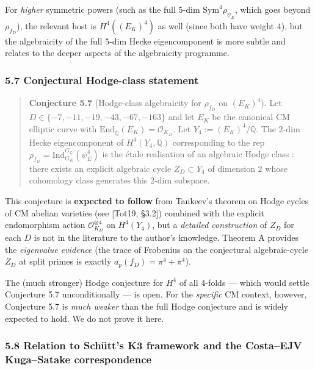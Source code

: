 \documentclass[
  11pt,
  a4paper,
]{amsart}
\begin{document}
For \emph{higher} symmetric powers (such as the full \(5\)-dim \(\mathrm{Sym}^4 \rho_{\psi_E}\), which goes beyond \(\rho_{f_D}\)), the relevant host is \(H^4((E_K)^4)\) as well (since both have weight \(4\)), but the algebraicity of the full \(5\)-dim Hecke eigencomponent is more subtle and relates to the deeper aspects of the algebraicity programme.

\hypertarget{conjectural-hodge-class-statement}{%
\subsubsection{5.7 Conjectural Hodge-class statement}\label{conjectural-hodge-class-statement}}

\begin{quote}
\textbf{Conjecture 5.7} (Hodge-class algebraicity for \(\rho_{f_D}\) on \((E_K)^4\)).
Let \(D \in \{-7, -11, -19, -43, -67, -163\}\) and let \(E_K\) be the canonical CM elliptic curve with \(\mathrm{End}_{\bar{\mathbb{Q}}}(E_K) = \mathcal{O}_{K_D}\). Let \(Y_4 := (E_K)^4 / \mathbb{Q}\). The \(2\)-dim Hecke eigencomponent of \(H^4(Y_4, \mathbb{Q})\) corresponding to the rep \(\rho_{f_D} = \mathrm{Ind}_{G_K}^{G_\mathbb{Q}}(\psi_E^4)\) is the étale realisation of an algebraic Hodge class : there exists an explicit algebraic cycle \(Z_D \subset Y_4\) of dimension \(2\) whose cohomology class generates this \(2\)-dim subspace.
\end{quote}

This conjecture is \textbf{expected to follow} from Tankeev's theorem on Hodge cycles of CM abelian varieties (see {[}Tot19, §3.2{]}) combined with the explicit endomorphism action \(\mathcal{O}_{K_D}^{\otimes 4}\) on \(H^4(Y_4)\), but a \emph{detailed construction} of \(Z_D\) for each \(D\) is not in the literature to the author's knowledge. Theorem A provides the \emph{eigenvalue evidence} (the trace of Frobenius on the conjectural algebraic-cycle \(Z_D\) at split primes is exactly \(a_p(f_D) = \pi^4 + \bar\pi^4\)).

The (much stronger) Hodge conjecture for \(H^4\) of all \(4\)-folds --- which would settle Conjecture 5.7 unconditionally --- is open. For the \emph{specific} CM context, however, Conjecture 5.7 is \emph{much weaker} than the full Hodge conjecture and is widely expected to hold. We do not prove it here.

\hypertarget{relation-to-schuxfctts-k3-framework-and-the-costaejv-kugasatake-correspondence}{%
\subsubsection{5.8 Relation to Schütt's K3 framework and the Costa--EJV Kuga--Satake correspondence}\label{relation-to-schuxfctts-k3-framework-and-the-costaejv-kugasatake-correspondence}}
\end{document}
